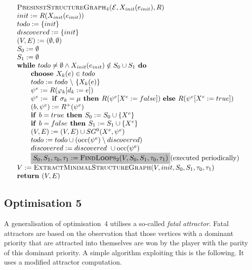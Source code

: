 \documentclass{article}
\newcommand{\Space}{\text{\ }}
\newcommand{\If}{\text{\textbf{if }}}
\newcommand{\Do}{\text{\textbf{ do }}}
\newcommand{\Then}{\text{\textbf{ then }}}
\newcommand{\Else}{\text{\textbf{else }}}
\newcommand{\While}{\text{\textbf{while }}}
\newcommand{\Choose}{\text{\textbf{choose }}}
\newcommand{\Return}{\text{\textbf{return }}}
\begin{document}
\begin{equation*}
\begin{array}{l}
\textsc{PbesinstStructureGraph$_{4}$(}\mathcal{E}, X_{init}(e_{init}), R) \\ 
init:=R(X_{init}(e_{init})) \\
todo:=\{init\} \\
discovered:=\{init\} \\
(V,E) :=(\emptyset ,\emptyset ) \\ 
S_0:= \emptyset \\
S_1:= \emptyset \\
\While todo \neq \emptyset \wedge X_{init}(e_{init}) \notin S_0 \cup S_1 \Do \\ 
\qquad \Choose X_{k}(e)\in todo \\ 
\qquad todo:=todo\ \backslash \ \{X_{k}(e)\} \\ 
\qquad \psi ^{e}:=R(\varphi _{k}[d_{k}:=e]) \\ 
\qquad \psi^e := \Space \If \sigma_k = \mu \Then R(\psi^e[X^e := false])
\Space \Else R(\psi^e[X^e := true]) \\
\qquad (b,\psi^e) := R^+(\psi^e) \\
\qquad \If b = true \Then S_0 := S_0 \cup \{ X^e \} \\
\qquad \If b = false \Then S_1 := S_1 \cup \{ X^e \} \\
\qquad (V,E) := (V,E) \cup SG^{0}(X^{e},\psi ^{e}) \\ 
\qquad todo:=todo\cup (\mathrm{occ}(\psi ^{e})\setminus discovered) \\
\qquad discovered:=discovered\ \cup \mathrm{occ}(\psi ^{e}) \\
\qquad \colorbox{lightgray}{$%
S_0, S_1,\tau_0,\tau_1 := \text{\textsc{FindLoops}}_2(V, S_0, S_1, \tau_0, \tau_1) $} \text{(executed periodically)} \\
V := \textsc{ExtractMinimalStructureGraph}(V, init, S_0, S_1, \tau_0, \tau_1) \\
\Return (V, E)
\end{array}%
\end{equation*}%

\subsection{Optimisation 5} 

A generalisation of optimisation~4 utilises a so-called \emph{fatal attractor}. Fatal attractors are based on the
observation that those vertices with a dominant priority that are attracted into themselves are won by the player
with the parity of this dominant priority. A simple algorithm exploiting this is the following. It uses a modified
attractor computation.
\end{document}
